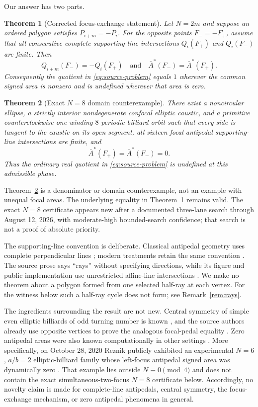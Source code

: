 \documentclass[11pt,a4paper]{amsart}
\newtheorem{theorem}{Theorem}[section]
\theoremstyle{definition}
\theoremstyle{remark}
\newcommand{\Abar}{\overline A}
\begin{document}
Our answer has two parts.

\begin{theorem}[Corrected focus-exchange statement]\label{thm:corrected}
Let $N=2m$ and suppose an ordered polygon satisfies
$P_{i+m}=-P_i$.  For the opposite points $F_-=-F_+$, assume that all
consecutive complete supporting-line intersections $Q_i(F_+)$ and
$Q_i(F_-)$ are finite.  Then
\[
 Q_{i+m}(F_-)=-Q_i(F_+)
 \quad\text{and}\quad
 \Abar^*(F_-)=\Abar^*(F_+).
\]
Consequently the quotient in \eqref{eq:source-problem} equals $1$ wherever
the common signed area is nonzero and is undefined wherever that area is
zero.
\end{theorem}

\begin{theorem}[Exact $N=8$ domain counterexample]\label{thm:counterexample}
There exist a noncircular ellipse, a strictly interior nondegenerate confocal
elliptic caustic, and a primitive counterclockwise one-winding $8$-periodic
billiard orbit such that every side is tangent to the caustic on its open
segment, all sixteen focal antipedal supporting-line intersections are finite,
and
\[
 \Abar^*(F_+)=\Abar^*(F_-)=0.
\]
Thus the ordinary real quotient in \eqref{eq:source-problem} is undefined at
this admissible phase.
\end{theorem}

Theorem~\ref{thm:counterexample} is a denominator or domain counterexample,
not an example with unequal focal areas.  The underlying equality in
Theorem~\ref{thm:corrected} remains valid.  The exact $N=8$ certificate
appears new after a documented three-lane search through August 12, 2026,
with moderate-high bounded-search confidence; that search is not a proof of
absolute priority.

The supporting-line convention is deliberate.  Classical antipedal geometry
uses complete perpendicular lines \cite[Chap.~VII]{Gallatly1910}; modern
treatments retain the same convention \cite{Mitrea2010,GarciaEtAl2020Hat}.
The source prose says ``rays'' without specifying directions, while its figure
and public implementation use unrestricted affine-line intersections
\cite{ReznikGarciaKoiller2020v11,ReznikEtAlRepository2020}.  We make no theorem about a polygon formed
from one selected half-ray at each vertex.  For the witness below such a
half-ray cycle does not form; see Remark~\ref{rem:rays}.

The ingredients surrounding the result are not new.  Central symmetry of
simple even elliptic billiards of odd turning number is known
\cite[Cor.~4.2(i)]{Stachel2021}, and the source authors already use opposite
vertices to prove the analogous focal-pedal equality
\cite[Sec.~3.7]{ReznikGarciaKoiller2021}.  Zero antipedal areas were also
known computationally in other settings \cite{Reznik2020Regular}.  More
specifically, on October 28, 2020 Reznik publicly exhibited an experimental
$N=6$, $a/b=2$ elliptic-billiard family whose left-focus antipedal signed area
was dynamically zero \cite{Reznik2020N6Focus}.  That example lies outside
$N\equiv0\pmod4$ and does not contain the exact simultaneous-two-focus $N=8$
certificate below.  Accordingly, no novelty claim is made for complete-line
antipedals, central symmetry, the focus-exchange mechanism, or zero antipedal
phenomena in general.
\end{document}
